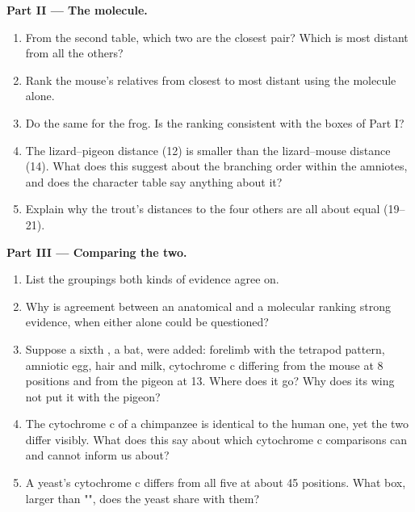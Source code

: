 \begin{problem}
\medskip
\noindent\textbf{Part II --- The molecule.}
\begin{enumerate}[resume]
  \item From the second table, which two  are the closest
        pair? Which  is most distant from all the others?
  \item Rank the mouse's relatives from closest to most distant using
        the molecule alone.
  \item Do the same for the frog. Is the ranking consistent with the
        boxes of Part I?
  \item The lizard--pigeon distance (12) is smaller than the
        lizard--mouse distance (14). What does this suggest about the
        branching order within the amniotes, and does the character
        table say anything about it?
  \item Explain why the trout's distances to the four others are all
        about equal (19--21).
\end{enumerate}

\medskip
\noindent\textbf{Part III --- Comparing the two.}
\begin{enumerate}[resume]
  \item List the groupings both kinds of evidence agree on.
  \item Why is agreement between an anatomical and a molecular
        ranking strong evidence, when either alone could be
        questioned?
  \item Suppose a sixth , a bat, were added: forelimb with the
        tetrapod pattern, amniotic egg, hair and milk, cytochrome c
        differing from the mouse at 8 positions and from the pigeon
        at 13. Where does it go? Why does its wing not put it with the
        pigeon?
  \item The cytochrome c of a chimpanzee is identical to the human
        one, yet the two  differ visibly. What does this say
        about which  cytochrome c comparisons can and cannot
        inform us about?
  \item A yeast's cytochrome c differs from all five at about 45
        positions. What box, larger than "", does the
        yeast share with them?
\end{enumerate}


\end{problem}
